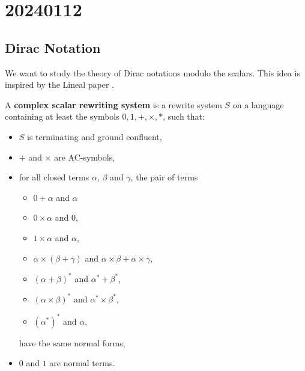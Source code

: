 \chapter{20240112}

\newcommand*{\unit}{\texttt{unit}}
\newcommand*{\utt}{\texttt{tt}}
\newcommand*{\fst}{\texttt{fst}}
\newcommand*{\snd}{\texttt{snd}}
\newcommand*{\reduce}{\ \triangleright\ }
\newcommand*{\reducefrom}{\ \triangleleft\ }

\newcommand*{\zeroK}[1]{\mathbf{0}_{\mathcal{K}(#1)}}
\newcommand*{\zeroB}[1]{\mathbf{0}_{\mathcal{B}(#1)}}
\newcommand*{\zeroO}[1]{\mathbf{0}_{\mathcal{O}(#1)}}

\section{Dirac Notation}

We want to study the theory of Dirac notations modulo the scalars. This idea is inspired by the Lineal paper \cite{Arrighi2017}.

\begin{definition}
  A \textbf{complex scalar rewriting system} is a rewrite system $S$ on a language containing at least the symbols $0, 1, +, \times, *$, such that:
  \begin{itemize}
    \item $S$ is terminating and ground confluent,
    \item $+$ and $\times$ are AC-symbols,
    \item for all closed terms $\alpha$, $\beta$ and $\gamma$, the pair of terms
      \begin{itemize}
        \item $0 + \alpha$ and $\alpha$
        \item $0 \times \alpha$ and $0$,
        \item $1 \times \alpha$ and $\alpha$,
        \item $\alpha \times (\beta + \gamma)$ and $\alpha \times \beta + \alpha \times \gamma$,
        \item $(\alpha + \beta)^*$ and $\alpha^* + \beta^*$,
        \item $(\alpha \times \beta)^*$ and $\alpha^* \times \beta^*$,
        \item $(\alpha^*)^*$ and $\alpha$,
      \end{itemize}
      have the same normal forms,
    \item $0$ and $1$ are normal terms.
  \end{itemize}
\end{definition}


